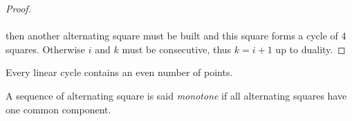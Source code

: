 \begin{proof}
\begin{figure}[H]
\begin{center}
      \caption{}
    \end{center}
  \end{figure}

  \paragraph{}
  then another alternating square must be built and this square forms a cycle of 4 squares. Otherwise $i$ and $k$ must be consecutive, thus $k = i+1$ up to duality.

\end{proof}

\begin{corollary}
  Every linear cycle contains an even number of points.
\end{corollary}

\begin{definition}
  A sequence of alternating square is said \textit{monotone} if all alternating squares have one common component.
\end{definition}

